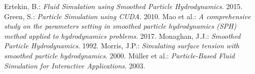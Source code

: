 \documentclass[a4paper,report]{IEEEtran}
\begin{document}
%
%
%
\begin{thebibliography}{1}


	Ertekin, B.: \emph{Fluid Simulation using Smoothed Particle Hydrodynamics}. 2015.
	Green, S.: \emph{Particle Simulation using CUDA}. 2010.
	Mao et al.: \emph{A comprehensive study on the parameters setting in smoothed particle hydrodynamics (SPH) method applied to hydrodynamics problems}. 2017.
	Monaghan, J.J.: \emph{Smoothed Particle Hydrodynamics}. 1992.
	Morris, J.P.: \emph{Simulating surface tension with smoothed particle hydrodynamics}. 2000.
	Müller et al.: \emph{Particle-Based Fluid Simulation for Interactive Applications}. 2003.

\end{thebibliography}




\end{document}

